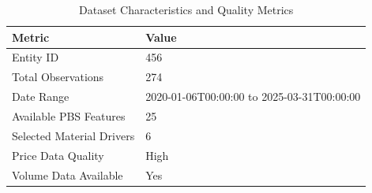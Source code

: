 \begin{table}
\caption{Dataset Characteristics and Quality Metrics}
\label{tab:data_summary}
\begin{tabular}{ll}
\toprule
Metric & Value \\
\midrule
Entity ID & 456 \\
Total Observations & 274 \\
Date Range & 2020-01-06T00:00:00 to 2025-03-31T00:00:00 \\
Available PBS Features & 25 \\
Selected Material Drivers & 6 \\
Price Data Quality & High \\
Volume Data Available & Yes \\
\bottomrule
\end{tabular}
\end{table}
